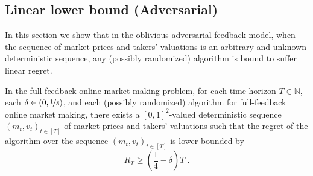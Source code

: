 \documentclass[final,12pt]{colt2025}
\newcommand{\N}{\mathbb{N}}
\newcommand{\lrb}[1]{\left(#1\right)}
\newcommand{\np}{m}
\newcommand{\nz}{v}
\begin{document}
\subsection{Linear lower bound  (Adversarial)}
In this section we show that in the oblivious adversarial feedback model, when the sequence of market prices and takers' valuations is an arbitrary and unknown deterministic sequence, any (possibly randomized) algorithm is bound to suffer linear regret.
\begin{theorem}
    \label{t:lower-full-info-adv}
    In the full-feedback online market-making problem, 
    for each time horizon $T \in \N$, each $\delta \in (0,\nicefrac{1}{8})$, and each (possibly randomized) algorithm for full-feedback online market making, there exists a $[0,1]^2$-valued deterministic sequence $(\np_t,\nz_t)_{t \in [T]}$ of market prices and takers' valuations such that the regret of the algorithm over the sequence $(\np_t,\nz_t)_{t \in [T]}$ is lower bounded by
    \[
        R_T \ge \lrb{\frac{1}{4}-\delta} T \;.  
    \]
\end{theorem}
\end{document}
